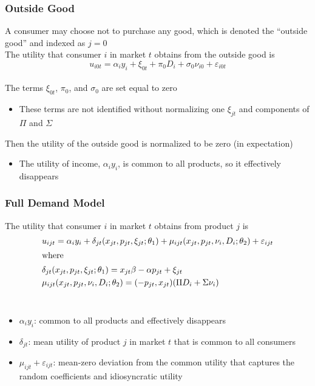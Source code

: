 \documentclass{beamer}
\begin{document}
\begin{frame}\frametitle{Outside Good}
    A consumer may choose not to purchase any good, which is denoted the ``outside good'' and indexed as $j = 0$ \\
    \vspace{2ex}
    The utility that consumer $i$ in market $t$ obtains from the outside good is
    $$u_{i0t} = \alpha_i y_i + \xi_{0t} + \pi_0 D_i + \sigma_0 \nu_{i0} + \varepsilon_{i0t}$$ \\
    \vspace{2ex}
    The terms $\xi_{0t}$, $\pi_0$, and $\sigma_0$ are set equal to zero
    \begin{itemize}
        \item These terms are not identified without normalizing one $\xi_{jt}$ and components of $\Pi$ and $\Sigma$
    \end{itemize}
    \vspace{2ex}
    Then the utility of the outside good is normalized to be zero (in expectation)
    \begin{itemize}
        \item The utility of income, $\alpha_i y_i$, is common to all products, so it effectively disappears
    \end{itemize}
\end{frame}

\begin{frame}\frametitle{Full Demand Model}
    The utility that consumer $i$ in market $t$ obtains from product $j$ is
    \begin{align*}
        &u_{ijt} = \alpha_i y_i + \delta_{jt}(x_{jt}, p_{jt}, \xi_{jt}; \theta_1) + \mu_{ijt}(x_{jt}, p_{jt}, \nu_i, D_i; \theta_2) + \varepsilon_{ijt} \\
        \intertext{where}
        &\delta_{jt}(x_{jt}, p_{jt}, \xi_{jt}; \theta_1) = x_{jt} \beta - \alpha p_{jt} + \xi_{jt} \\
        &\mu_{ijt}(x_{jt}, p_{jt}, \nu_i, D_i; \theta_2) = (-p_{jt}, x_{jt}) (\Pi D_i + \Sigma \nu_i)
    \end{align*} \\
    \vspace{-1ex}
    \begin{itemize}
        \item $\alpha_i y_i$: common to all products and effectively disappears
        \item $\delta_{jt}$: mean utility of product $j$ in market $t$ that is common to all consumers
        \item $\mu_{ijt} + \varepsilon_{ijt}$: mean-zero deviation from the common utility that captures the random coefficients and idiosyncratic utility
    \end{itemize}
\end{frame}
\end{document}
